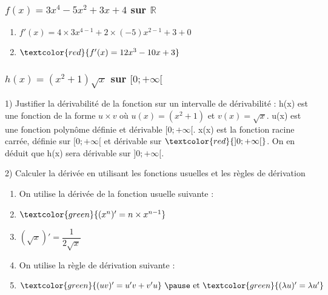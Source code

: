 \documentclass[t]{beamer}
\begin{document}
\begin{frame}
\frametitle{$f(x) = 3x^4 - 5x^2 + 3x + 4 $ sur $\mathbb{R}$}
\pause
\begin{enumerate}[]
\item \(f'(x) = 4 \times 3x^{4-1} + 2 \times (-5)x^{2-1} + 3 + 0 \)
\pause
\item \(\textcolor{red}{f'(x) = 12x^{3} -10x + 3} \)
\pause
\end{enumerate}
\end{frame}

\begin{frame}
\frametitle{$h(x) = (x^2+1)\sqrt{x} $ sur $[0;+\infty[$}
\begin{block}{1) Justifier la dérivabilité de la fonction sur un intervalle de dérivabilité :}
\pause
h(x) est une fonction de la forme $u \times v$ où $u(x)= (x^2+1) $ et $v(x)= \sqrt{x}$. u(x) est une fonction polynôme définie et dérivable $[0;+\infty[$. x(x) est la fonction racine carrée, définie sur $[0;+\infty[$ et dérivable sur $\textcolor{red}{]0;+\infty[}$. On en déduit que h(x) sera dérivable sur $]0;+\infty[$.
\pause
\end{block}

\begin{block}{2) Calculer la dérivée en utilisant les fonctions usuelles et les règles de dérivation}
\pause
\begin{enumerate}[]
\item On utilise la dérivée de la fonction usuelle suivante :
\pause
\item \(\textcolor{green}{ (x^n)' = n \times x^{n-1} }\)
\pause
\item \((\sqrt{x})' = \dfrac{1}{2\sqrt{x}} \)
\pause
\item On utilise la règle de dérivation suivante :
\pause
\item \(\textcolor{green}{(uv)' = u'v + v'u}$ \pause et $\textcolor{green}{ (\lambda u)' = \lambda u'}\)
\pause
\end{enumerate}
\end{block}
\end{frame}
\end{document}
